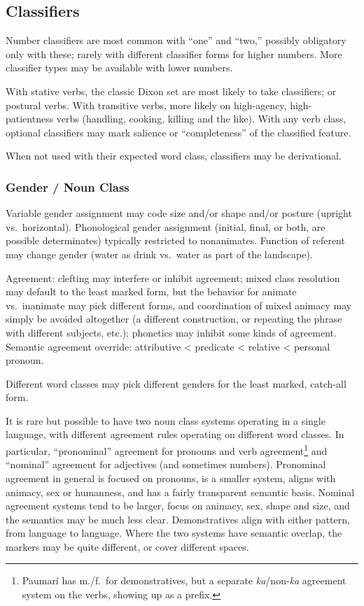 \documentclass[11pt]{article}
\begin{document}
\subsection{Classifiers}
Number classifiers are most common with ``one'' and ``two,'' possibly
obligatory only with these; rarely with different classifier forms for
higher numbers.  More classifier types may be available with lower
numbers.

With stative verbs, the classic Dixon set are most likely to take
classifiers; or postural verbs.  With transitive verbs, more likely on
high-agency, high-patientness verbs (handling, cooking, killing and
the like).  With any verb class, optional classifiers may mark
salience or ``completeness'' of the classified feature.

When not used with their expected word class, classifiers may be
derivational.

\subsubsection{Gender / Noun Class}
Variable gender assignment may code size and/or shape and/or posture
(upright vs.\ horizontal).  Phonological gender assignment (initial,
final, or both, are possible determinates) typically restricted to
nonanimates.  Function of referent may change gender (water as drink
vs.\ water as part of the landscape).

Agreement: clefting may interfere or inhibit agreement; mixed class
resolution may default to the least marked form, but the behavior for
animate vs.\ inanimate may pick different forms, and coordination of
mixed animacy may simply be avoided altogether (a different
construction, or repeating the phrase with different subjects, etc.);
phonetics may inhibit some kinds of agreement.  Semantic agreement
override: attributive < predicate < relative < personal pronoun.

Different word classes may pick different genders for the least
marked, catch-all form.

It is rare but possible to have two noun class systems operating in a
single language, with different agreement rules operating on different
word classes.  In particular, ``pronominal'' agreement for pronouns
and verb agreement\footnote{Paumarí has m./f.\ for demonstratives, but
a separate \textit{ka}/non-\textit{ka} agreement system on the
verbs, showing up as a prefix.} and ``nominal'' agreement for
adjectives (and sometimes numbers).  Pronominal agreement in general
is focused on pronouns, is a smaller system, aligns with animacy, sex
or humanness, and has a fairly transparent semantic basis.  Nominal
agreement systems tend to be larger, focus on animacy, sex, shape and
size, and the semantics may be much less clear.  Demonstratives align
with either pattern, from language to language.  Where the two systems
have semantic overlap, the markers may be quite different, or cover
different spaces.
\end{document}
